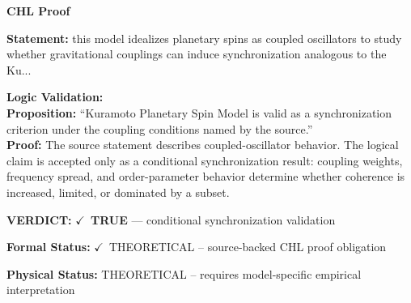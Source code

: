 \vspace{0.45em}
\noindent\textbf{CHL Proof}\par
\textbf{Statement:} this model idealizes planetary spins as coupled oscillators to study whether
gravitational couplings can induce synchronization analogous to the Ku...

\textbf{Logic Validation:}\\
\textbf{Proposition:} ``Kuramoto Planetary Spin Model is valid as a synchronization criterion under the coupling
conditions named by the source.''\\
\textbf{Proof:} The source statement describes coupled-oscillator behavior. The logical claim is
accepted only as a conditional synchronization result: coupling weights, frequency
spread, and order-parameter behavior determine whether coherence is increased, limited,
or dominated by a subset.

\textbf{VERDICT:} \ensuremath{\checkmark}\ \textbf{TRUE} --- conditional synchronization validation

\textbf{Formal Status:} \ensuremath{\checkmark}\ THEORETICAL -- source-backed CHL proof obligation

\textbf{Physical Status:} THEORETICAL -- requires model-specific empirical interpretation
\par\vspace{0.45em}
\par
\ifTZPDarkEdition
{}
\fi
\endgroup
\endgroup
